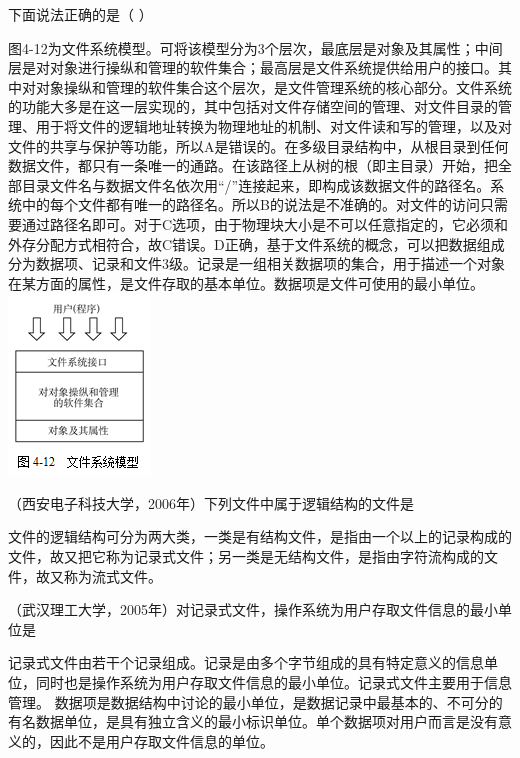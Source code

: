 \question 下面说法正确的是（ ）
\par{}
\begin{solution}图4-12为文件系统模型。可将该模型分为3个层次，最底层是对象及其属性；中间层是对对象进行操纵和管理的软件集合；最高层是文件系统提供给用户的接口。其中对对象操纵和管理的软件集合这个层次，是文件管理系统的核心部分。文件系统的功能大多是在这一层实现的，其中包括对文件存储空间的管理、对文件目录的管理、用于将文件的逻辑地址转换为物理地址的机制、对文件读和写的管理，以及对文件的共享与保护等功能，所以A是错误的。在多级目录结构中，从根目录到任何数据文件，都只有一条唯一的通路。在该路径上从树的根（即主目录）开始，把全部目录文件名与数据文件名依次用``/''连接起来，即构成该数据文件的路径名。系统中的每个文件都有唯一的路径名。所以B的说法是不准确的。对文件的访问只需要通过路径名即可。对于C选项，由于物理块大小是不可以任意指定的，它必须和外存分配方式相符合，故C错误。D正确，基于文件系统的概念，可以把数据组成分为数据项、记录和文件3级。记录是一组相关数据项的集合，用于描述一个对象在某方面的属性，是文件存取的基本单位。数据项是文件可使用的最小单位。
\includegraphics[width=1.48958in,height=1.89583in]{computerassets/7FB65A386B59F21177FA84BE6D2561FB.png}
\end{solution}
\question （西安电子科技大学，2006年）下列文件中属于逻辑结构的文件是
\par{}
\begin{solution}文件的逻辑结构可分为两大类，一类是有结构文件，是指由一个以上的记录构成的文件，故又把它称为记录式文件；另一类是无结构文件，是指由字符流构成的文件，故又称为流式文件。
\end{solution}
\question （武汉理工大学，2005年）对记录式文件，操作系统为用户存取文件信息的最小单位是
\par{}
\begin{solution}记录式文件由若干个记录组成。记录是由多个字节组成的具有特定意义的信息单位，同时也是操作系统为用户存取文件信息的最小单位。记录式文件主要用于信息管理。
数据项是数据结构中讨论的最小单位，是数据记录中最基本的、不可分的有名数据单位，是具有独立含义的最小标识单位。单个数据项对用户而言是没有意义的，因此不是用户存取文件信息的单位。
\end{solution}
